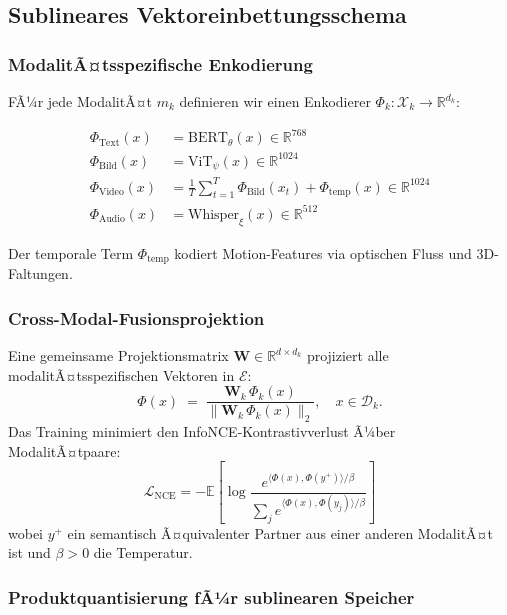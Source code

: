 ﻿\documentclass[12pt,a4paper]{article}
\begin{document}
\subsection{Sublineares Vektoreinbettungsschema}
\label{sec:embedding}

\subsubsection{ModalitÃ¤tsspezifische Enkodierung}

FÃ¼r jede ModalitÃ¤t $m_k$ definieren wir einen Enkodierer 
$\Phi_k: \mathcal{X}_k \to \mathbb{R}^{d_k}$:

\begin{align}
  \Phi_{\text{Text}}(x) &= \text{BERT}_\theta(x) \in \mathbb{R}^{768} \\
  \Phi_{\text{Bild}}(x) &= \text{ViT}_\psi(x) \in \mathbb{R}^{1024} \\
  \Phi_{\text{Video}}(x) &= \frac{1}{T}\sum_{t=1}^T \Phi_{\text{Bild}}(x_t) + 
                            \Phi_{\text{temp}}(x) \in \mathbb{R}^{1024}\\
  \Phi_{\text{Audio}}(x) &= \text{Whisper}_\xi(x) \in \mathbb{R}^{512}
\end{align}

Der temporale Term $\Phi_{\text{temp}}$ kodiert Motion-Features via 
optischen Fluss und 3D-Faltungen.

\subsubsection{Cross-Modal-Fusionsprojektion}

Eine gemeinsame Projektionsmatrix $\mathbf{W} \in \mathbb{R}^{d \times d_k}$ 
projiziert alle modalitÃ¤tsspezifischen Vektoren in $\mathcal{E}$:
\[
  \Phi(x) \;=\; \frac{\mathbf{W}_k\, \Phi_k(x)}
                     {\|\mathbf{W}_k\, \Phi_k(x)\|_2},
  \quad x \in \mathcal{D}_k.
\]
Das Training minimiert den InfoNCE-Kontrastivverlust Ã¼ber ModalitÃ¤tpaare:
\begin{equation}
  \mathcal{L}_{\text{NCE}} = -\mathbb{E}\left[
    \log \frac{e^{\langle \Phi(x), \Phi(y^+)\rangle/\beta}}
    {\sum_{j} e^{\langle \Phi(x), \Phi(y_j)\rangle/\beta}}
  \right]
  \label{eq:nce}
\end{equation}
wobei $y^+$ ein semantisch Ã¤quivalenter Partner aus einer anderen 
ModalitÃ¤t ist und $\beta > 0$ die Temperatur.

\subsubsection{Produktquantisierung fÃ¼r sublinearen Speicher}
\end{document}
